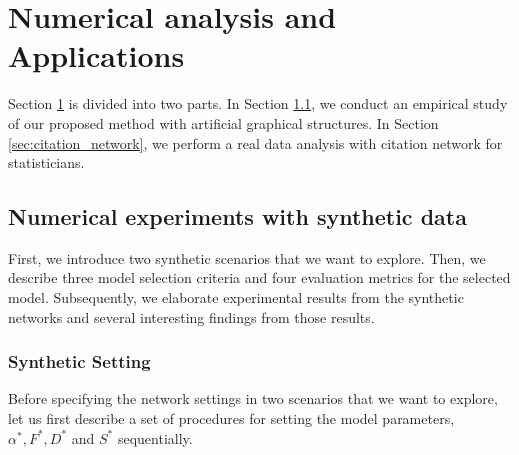 \documentclass[AMS,STIX1COL]{WileyNJD-v2}
\begin{document}
{\section{ Numerical analysis and Applications}
\label{sec:Num-anal}
Section \ref{sec:Num-anal} is divided into two parts.
In Section \ref{sec:Syn-dat}, we conduct an empirical study of our proposed method with artificial graphical structures.
In Section \ref{sec:citation_network}, we perform a real data analysis with citation network for statisticians.


\subsection{Numerical experiments with synthetic data}
\label{sec:Syn-dat}
First, we introduce two synthetic scenarios that we want to explore.
Then, we describe three model selection criteria and four evaluation metrics for the selected model.
Subsequently, we elaborate experimental results from the synthetic networks and several interesting findings from those results.

\subsubsection{Synthetic Setting}
Before specifying the network settings in two scenarios that we want to explore, let us first describe a set of procedures for setting the model parameters, $\alpha^*, F^*, D^*$ and $S^*$ sequentially.

}
\end{document}
